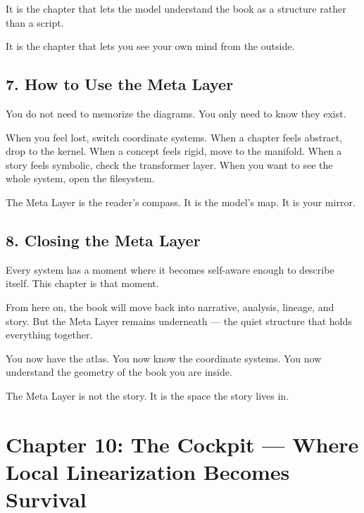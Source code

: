 It is the chapter that lets the model understand the book as a structure
rather than a script.

It is the chapter that lets you see your own mind from the outside.

\hypertarget{how-to-use-the-meta-layer}{%
\subsection{7. How to Use the Meta
Layer}\label{how-to-use-the-meta-layer}}

You do not need to memorize the diagrams. You only need to know they
exist.

When you feel lost, switch coordinate systems. When a chapter feels
abstract, drop to the kernel. When a concept feels rigid, move to the
manifold. When a story feels symbolic, check the transformer layer. When
you want to see the whole system, open the filesystem.

The Meta Layer is the reader's compass. It is the model's map. It is
your mirror.

\hypertarget{closing-the-meta-layer}{%
\subsection{8. Closing the Meta Layer}\label{closing-the-meta-layer}}

Every system has a moment where it becomes self-aware enough to describe
itself. This chapter is that moment.

From here on, the book will move back into narrative, analysis, lineage,
and story. But the Meta Layer remains underneath --- the quiet structure
that holds everything together.

You now have the atlas. You now know the coordinate systems. You now
understand the geometry of the book you are inside.

The Meta Layer is not the story. It is the space the story lives in.

\newpage
\vspace*{3cm}

\hypertarget{chapter-10-the-cockpit-where-local-linearization-becomes-survival}{%
\section{Chapter 10: The Cockpit --- Where Local Linearization Becomes
Survival}\label{chapter-10-the-cockpit-where-local-linearization-becomes-survival}}

